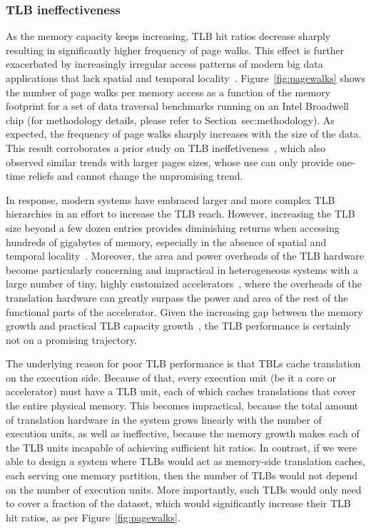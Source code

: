 \subsubsection{TLB ineffectiveness}
As the memory capacity keeps increasing, TLB hit ratios decrease sharply~\cite{basu:efficient} resulting in significantly higher frequency of page walks. This effect is further exacerbated by increasingly irregular access patterns of modern big data applications that lack spatial and temporal locality~\cite{}. Figure~\ref{fig:pagewalks} shows the number of page walks per memory access as a function of the memory footprint for a set of data traversal benchmarks running on an Intel Broadwell chip (for methodology details, please refer to Section~{sec:methodology}). As expected, the frequency of page walks sharply increases with the size of the data. This result corroborates a prior study on TLB ineffetiveness~\cite{basu:efficient}, which also observed similar trends with larger pages sizes, whose use can only provide one-time reliefs and cannot change the unpromising trend. 

In response, modern systems have embraced larger and more complex TLB hierarchies in an effort to increase the TLB reach. However, increasing the TLB size beyond a few dozen entries provides diminishing returns when accessing hundreds of gigabytes of memory, especially in the absence of spatial and temporal locality~\cite{}. Moreover, the area and power overheads of the TLB hardware become particularly concerning and impractical in heterogeneous systems with a large number of tiny, highly customized accelerators~\cite{haria:devirtualizing}, where the overheads of the translation hardware can greatly surpass the power and area of the rest of the functional parts of the accelerator. Given the increasing gap between the memory growth and practical TLB capacity growth~\cite{gandhi:badgertrap}, the TLB performance is certainly not on a promising trajectory.

The underlying reason for poor TLB performance is that TBLs cache translation on the execution side. Because of that, every execution unit (be it a core or accelerator) must have a TLB unit, each of which caches translations that cover the entire physical memory. This becomes impractical, because the total amount of translation hardware in the system grows linearly with the number of execution units, as well as ineffective, because the memory growth makes each of the TLB units incapable of achieving sufficient hit ratios. In contrast, if we were able to design a system where TLBs would act as memory-side translation caches, each serving one memory partition, then the number of TLBs would not depend on the number of execution units. More importantly, such TLBs would only need to cover a fraction of the dataset, which would significantly increase their TLB hit ratios, as per Figure~\ref{fig:pagewalks}.

